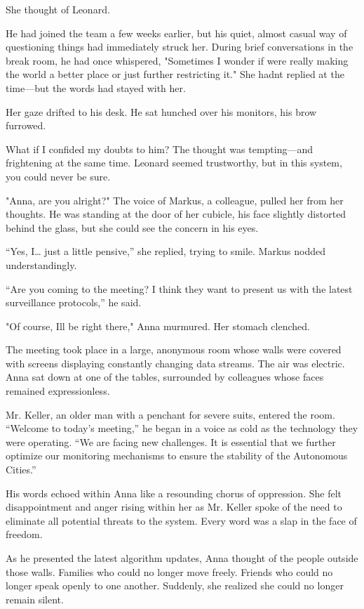 \documentclass[
]{article}
\begin{document}
She thought of Leonard.

He had joined the team a few weeks earlier, but his quiet, almost casual way of questioning things had immediately struck her. During brief conversations in the break room, he had once whispered, "Sometimes I wonder if we\textquotesingle re really making the world a better place or just further restricting it." She hadn\textquotesingle t replied at the time---but the words had stayed with her.

Her gaze drifted to his desk. He sat hunched over his monitors, his brow furrowed.

What if I confided my doubts to him? The thought was tempting---and frightening at the same time. Leonard seemed trustworthy, but in this system, you could never be sure.

"Anna, are you alright?" The voice of Markus, a colleague, pulled her from her thoughts. He was standing at the door of her cubicle, his face slightly distorted behind the glass, but she could see the concern in his eyes.

``Yes, I\ldots{} just a little pensive,'' she replied, trying to smile. Markus nodded understandingly.

``Are you coming to the meeting? I think they want to present us with the latest surveillance protocols,'' he said.

"Of course, I\textquotesingle ll be right there," Anna murmured. Her stomach clenched.

The meeting took place in a large, anonymous room whose walls were covered with screens displaying constantly changing data streams. The air was electric. Anna sat down at one of the tables, surrounded by colleagues whose faces remained expressionless.

Mr. Keller, an older man with a penchant for severe suits, entered the room. ``Welcome to today's meeting,'' he began in a voice as cold as the technology they were operating. ``We are facing new challenges. It is essential that we further optimize our monitoring mechanisms to ensure the stability of the Autonomous Cities.''

His words echoed within Anna like a resounding chorus of oppression. She felt disappointment and anger rising within her as Mr. Keller spoke of the need to eliminate all potential threats to the system. Every word was a slap in the face of freedom.

As he presented the latest algorithm updates, Anna thought of the people outside those walls. Families who could no longer move freely. Friends who could no longer speak openly to one another. Suddenly, she realized she could no longer remain silent.
\end{document}
